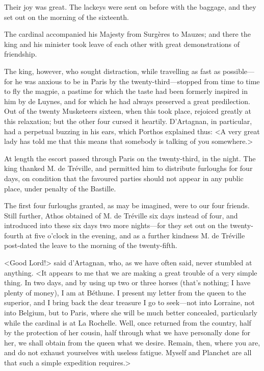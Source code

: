 Their joy was great. The lackeys were sent on before with the baggage, and they set out on the morning of the sixteenth. 

The cardinal accompanied his Majesty from Surgères to Mauzes; and there the king and his minister took leave of each other with great demonstrations of friendship. 

The king, however, who sought distraction, while travelling as fast as possible---for he was anxious to be in Paris by the twenty-third---stopped from time to time to fly the magpie, a pastime for which the taste had been formerly inspired in him by de Luynes, and for which he had always preserved a great predilection. Out of the twenty Musketeers sixteen, when this took place, rejoiced greatly at this relaxation; but the other four cursed it heartily. D'Artagnan, in particular, had a perpetual buzzing in his ears, which Porthos explained thus: <A very great lady has told me that this means that somebody is talking of you somewhere.> 

At length the escort passed through Paris on the twenty-third, in the night. The king thanked M. de Tréville, and permitted him to distribute furloughs for four days, on condition that the favoured parties should not appear in any public place, under penalty of the Bastille. 

The first four furloughs granted, as may be imagined, were to our four friends. Still further, Athos obtained of M. de Tréville six days instead of four, and introduced into these six days two more nights---for they set out on the twenty-fourth at five o'clock in the evening, and as a further kindness M. de Tréville post-dated the leave to the morning of the twenty-fifth. 

<Good Lord!> said d'Artagnan, who, as we have often said, never stumbled at anything. <It appears to me that we are making a great trouble of a very simple thing. In two days, and by using up two or three horses (that's nothing; I have plenty of money), I am at Béthune. I present my letter from the queen to the superior, and I bring back the dear treasure I go to seek---not into Lorraine, not into Belgium, but to Paris, where she will be much better concealed, particularly while the cardinal is at La Rochelle. Well, once returned from the country, half by the protection of her cousin, half through what we have personally done for her, we shall obtain from the queen what we desire. Remain, then, where you are, and do not exhaust yourselves with useless fatigue. Myself and Planchet are all that such a simple expedition requires.> 

